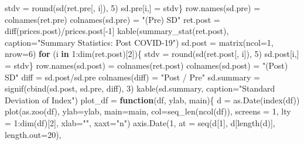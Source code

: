 \documentclass[
  11pt,
]{article}
\newenvironment{Shaded}{\begin{snugshade}}{\end{snugshade}}
\newcommand{\AttributeTok}[1]{\textcolor[rgb]{0.77,0.63,0.00}{#1}}
\newcommand{\ControlFlowTok}[1]{\textcolor[rgb]{0.13,0.29,0.53}{\textbf{#1}}}
\newcommand{\DecValTok}[1]{\textcolor[rgb]{0.00,0.00,0.81}{#1}}
\newcommand{\FunctionTok}[1]{\textcolor[rgb]{0.00,0.00,0.00}{#1}}
\newcommand{\NormalTok}[1]{#1}
\newcommand{\OtherTok}[1]{\textcolor[rgb]{0.56,0.35,0.01}{#1}}
\newcommand{\SpecialCharTok}[1]{\textcolor[rgb]{0.00,0.00,0.00}{#1}}
\newcommand{\StringTok}[1]{\textcolor[rgb]{0.31,0.60,0.02}{#1}}
\begin{document}
\begin{Shaded}
\begin{Highlighting}[]
\NormalTok{  stdv }\OtherTok{=} \FunctionTok{round}\NormalTok{(}\FunctionTok{sd}\NormalTok{(ret.pre[, i]), }\DecValTok{5}\NormalTok{)}
\NormalTok{    sd.pre[i,] }\OtherTok{=}\NormalTok{ stdv\}}
\FunctionTok{row.names}\NormalTok{(sd.pre) }\OtherTok{=} \FunctionTok{colnames}\NormalTok{(ret.pre)}
\FunctionTok{colnames}\NormalTok{(sd.pre) }\OtherTok{=} \StringTok{"(Pre) SD"}
\NormalTok{ret.post }\OtherTok{=} \FunctionTok{diff}\NormalTok{(prices.post)}\SpecialCharTok{/}\NormalTok{prices.post[}\SpecialCharTok{{-}}\DecValTok{1}\NormalTok{]}
\FunctionTok{kable}\NormalTok{(}\FunctionTok{summary\_stat}\NormalTok{(ret.post), }\AttributeTok{caption=}\StringTok{"Summary Statistics: Post COVID{-}19"}\NormalTok{)}
\NormalTok{sd.post }\OtherTok{=} \FunctionTok{matrix}\NormalTok{(}\AttributeTok{ncol=}\DecValTok{1}\NormalTok{, }\AttributeTok{nrow=}\DecValTok{6}\NormalTok{)}
\ControlFlowTok{for}\NormalTok{ (i }\ControlFlowTok{in} \DecValTok{1}\SpecialCharTok{:}\FunctionTok{dim}\NormalTok{(ret.post)[}\DecValTok{2}\NormalTok{])\{}
\NormalTok{  stdv }\OtherTok{=} \FunctionTok{round}\NormalTok{(}\FunctionTok{sd}\NormalTok{(ret.post[, i]), }\DecValTok{5}\NormalTok{)}
\NormalTok{  sd.post[i,] }\OtherTok{=}\NormalTok{ stdv\}}
\FunctionTok{row.names}\NormalTok{(sd.post) }\OtherTok{=} \FunctionTok{colnames}\NormalTok{(ret.post)}
\FunctionTok{colnames}\NormalTok{(sd.post) }\OtherTok{=} \StringTok{"(Post) SD"}
\NormalTok{diff }\OtherTok{=}\NormalTok{ sd.post}\SpecialCharTok{/}\NormalTok{sd.pre}
\FunctionTok{colnames}\NormalTok{(diff) }\OtherTok{=} \StringTok{"Post / Pre"}
\NormalTok{sd.summary }\OtherTok{=} \FunctionTok{signif}\NormalTok{(}\FunctionTok{cbind}\NormalTok{(sd.post, sd.pre, diff), }\DecValTok{3}\NormalTok{)}
\FunctionTok{kable}\NormalTok{(sd.summary, }\AttributeTok{caption=}\StringTok{"Standard Deviation of Index"}\NormalTok{)}
\NormalTok{plot\_df }\OtherTok{=} \ControlFlowTok{function}\NormalTok{(df, ylab, main)\{}
\NormalTok{  d }\OtherTok{=} \FunctionTok{as.Date}\NormalTok{(}\FunctionTok{index}\NormalTok{(df))}
  \FunctionTok{plot}\NormalTok{(}\FunctionTok{as.zoo}\NormalTok{(df), }\AttributeTok{ylab=}\NormalTok{ylab, }\AttributeTok{main=}\NormalTok{main, }\AttributeTok{col=}\FunctionTok{seq\_len}\NormalTok{(}\FunctionTok{ncol}\NormalTok{(df)), }\AttributeTok{screens =} \DecValTok{1}\NormalTok{, }\AttributeTok{lty =} \DecValTok{1}\SpecialCharTok{:}\FunctionTok{dim}\NormalTok{(df)[}\DecValTok{2}\NormalTok{], }\AttributeTok{xlab=}\StringTok{""}\NormalTok{, }\AttributeTok{xaxt=}\StringTok{"n"}\NormalTok{)}
  \FunctionTok{axis.Date}\NormalTok{(}\DecValTok{1}\NormalTok{, }\AttributeTok{at =} \FunctionTok{seq}\NormalTok{(d[}\DecValTok{1}\NormalTok{], d[}\FunctionTok{length}\NormalTok{(d)], }\AttributeTok{length.out=}\DecValTok{20}\NormalTok{),}

\end{Highlighting}
\end{Shaded}
\end{document}
